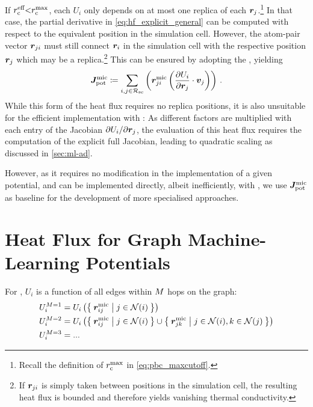 If $r_{\text{c}}^{\text{eff}}{<}r_{\text{c}}^{\text{max}}$, each $U_i$ only depends on at most one replica of each $\boldsymbol{r}_j$.\footnote{Recall the definition of $r_{\text{c}}^{\text{max}}$ in \cref{eq:pbc_maxcutoff}.}
In that case, the partial derivative in \cref{eq:hf_explicit_general} can be computed with respect to the equivalent position in the simulation cell. However, the atom-pair vector $\boldsymbol{r}_{ji}$ must still connect $\boldsymbol{r}_i$ in the simulation cell with the respective position $\boldsymbol{r}_j$ which may be a replica.\footnote{If $\boldsymbol{r}_{ji}$ is simply taken between positions in the simulation cell, the resulting heat flux is bounded and therefore yields vanishing thermal conductivity.} This can be ensured by adopting the \mic, yielding
\begin{equation}
	\Jmic \defas \sum_{i,j \in \Rsc} \left(\Rm_{ji} \left(\dur{i}{j}{} \cdot \V_j\right) \right) \, . \label{eq:hf_jmic}
\end{equation}
While this form of the heat flux requires no replica positions, it is also unsuitable for the efficient implementation with \ad: As different factors are multiplied with each entry of the Jacobian $\partial U_{i} / \partial \boldsymbol{r}_{j}$, the evaluation of this heat flux requires the computation of the explicit full Jacobian, leading to quadratic scaling as discussed in \cref{sec:ml-ad}.

However, as it requires no modification in the implementation of a given potential, and can be implemented directly, albeit inefficiently, with \ad, we use $\boldsymbol{J}^{\text{mic}}_\text{pot}$ as baseline for the development of more specialised approaches.

\clearpage
\section{Heat Flux for Graph Machine-Learning Potentials}
\label{sec:hf_glps}

For \glps, $U_i$ is a function of all edges within $M$ hops on the graph:
\begin{align}
	U_i^{\interactions=1} &= U_i\left(\curlyset{\Rm_{ij}}{j \in \nbh{i}}\right)  \label{eq:hfi_ui_t1}  \nonumber\\
	U_i^{\interactions=2} &= U_i\left(\curlyset{\Rm_{ij}}{j \in \nbh{i}} \cup \curlyset{\Rm_{jk}}{j \in \nbh{i}, k \in \nbh{j}}\right)   \nonumber\\
	U_i^{\interactions=3} &= ... \nonumber
\end{align}

